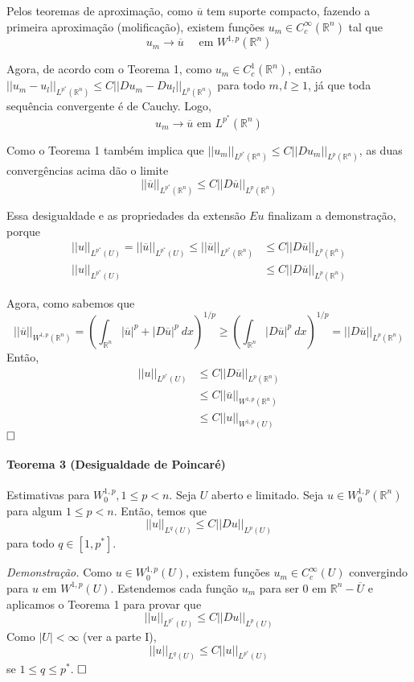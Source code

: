\documentclass[a4paper, 11pt]{article}
\newcommand{\qed}{$\hfill\square$}
\newcommand{\Rn}{{\mathbb{R}^n}}
\newcommand{\nor}[2]{||#1||_{#2}}
\begin{document}
Pelos teoremas de aproximação, como $\overline{u}$ tem suporte compacto, fazendo a primeira aproximação (molificação), existem funções $ u_m \in C^\infty_c(\Rn) $ tal que \[ u_m \rightarrow \overline{u} \quad \text{ em } W^{1,p}(\Rn) \]

Agora, de acordo com o Teorema 1, como $u_m \in C^1_c(\Rn)$, então $ ||u_m - u_l||_{L^{p^*}(\Rn)} \leq C ||Du_m  - Du_l||_{L^p(\Rn)} $ para todo $m,l \geq 1$, já que toda sequência convergente é de Cauchy. Logo, \[ u_m \rightarrow \overline{u} \text{ em } L^{p^*}(\Rn) \]

Como o Teorema 1 também implica que $ ||u_m||_{L^{p^*}(\Rn)} \leq C ||Du_m||_{L^p(\Rn)} $, as duas convergências acima dão o limite \[ ||\overline{u}||_{L^{p^*}(\Rn)} \leq C ||D\overline{u}||_{L^{p}(\Rn)} \]

Essa desigualdade e as propriedades da extensão $Eu$ finalizam a demonstração, porque \begin{align*}
	 ||u||_{L^{p^*}(U)} = ||\overline{u}||_{L^{p^*}(U)} \leq ||\overline{u}||_{L^{p^*}(\Rn)} &\leq  C ||D\overline{u}||_{L^{p}(\Rn)} \\
	  ||u||_{L^{p^*}(U)}  &\leq  C ||D\overline{u}||_{L^{p}(\Rn)}
\end{align*}

Agora, como sabemos que \[ ||\overline{u}||_{W^{1,p}(\Rn)} = \left( \int_\Rn |\overline{u}|^p + |D\overline{u}|^p\ dx \right)^{1/p} \geq \left(\int_\Rn |D\overline{u}|^p\ dx \right)^{1/p} = ||D\overline{u}||_{L^p(\Rn)}\] Então, \begin{align*}
	 ||u||_{L^{p^*}(U)}  &\leq  C ||D\overline{u}||_{L^{p}(\Rn)} \\
	  &\leq  C ||\overline{u}||_{W^{1,p}(\Rn)} \\
	  &\leq   C \nor{u}{W^{1,p}(U)} 
\end{align*}\qed





\paragraph{Teorema 3 (Desigualdade de Poincaré)}\label{t:sobolev-ineq-t3} Estimativas para \( W^{1,p}_0, 1 \leq p < n\). Seja \(U\) aberto e limitado. Seja $u \in W^{1,p}_0(\mathbb{R}^n)$ para algum \(1 \leq p < n\). Então, temos que \[ ||u||_{L^q(U)} \leq C ||Du||_{L^p(U)} \] para todo \( q \in [1, p^*]\). 

\textit{Demonstração.} Como $u \in W^{1,p}_0(U)$, existem funções $u_m \in C^\infty_c(U)$ convergindo para $u$ em $ W^{1,p}(U)$. Estendemos cada função $u_m$ para ser 0 em $\Rn-\overline{U}$ e aplicamos o Teorema 1 para provar que \[ ||u||_{L^{p^*}(U)} \leq C ||Du||_{L^p(U)} \] Como $ |U| < \infty  $ (ver a parte I), \[ ||u||_{L^q(U)} \leq C||u||_{L^{p^*}(U)} \] se $1 \leq q \leq p^*$. \qed
\end{document}
